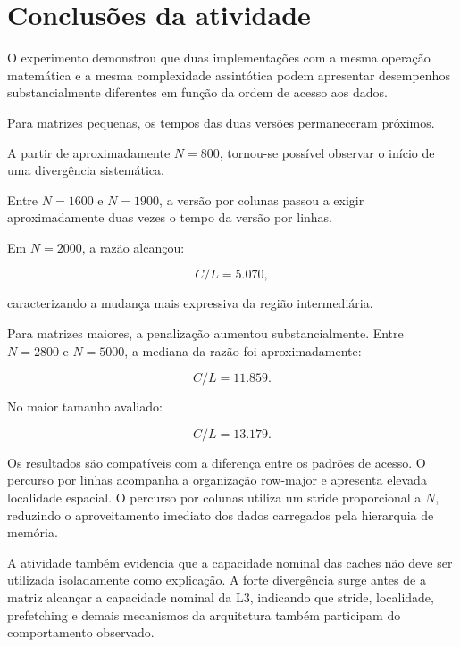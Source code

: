 
\section{Conclusões da atividade}

\label{sec:atvd01-conclusao}

O experimento demonstrou que duas implementações com a mesma operação
matemática e a mesma complexidade assintótica podem apresentar
desempenhos substancialmente diferentes em função da ordem de acesso aos
dados.

Para matrizes pequenas, os tempos das duas versões permaneceram próximos.

A partir de aproximadamente \(N=800\), tornou-se possível observar o
início de uma divergência sistemática.

Entre \(N=1600\) e \(N=1900\), a versão por colunas passou a exigir
aproximadamente duas vezes o tempo da versão por linhas.

Em \(N=2000\), a razão alcançou:

\begin{equation}
    C/L = 5.070,
\end{equation}

caracterizando a mudança mais expressiva da região intermediária.

Para matrizes maiores, a penalização aumentou substancialmente. Entre
\(N=2800\) e \(N=5000\), a mediana da razão foi aproximadamente:

\begin{equation}
    C/L = 11.859.
\end{equation}

No maior tamanho avaliado:

\begin{equation}
    C/L = 13.179.
\end{equation}

Os resultados são compatíveis com a diferença entre os padrões de acesso.
O percurso por linhas acompanha a organização row-major e apresenta
elevada localidade espacial. O percurso por colunas utiliza um stride
proporcional a \(N\), reduzindo o aproveitamento imediato dos dados
carregados pela hierarquia de memória.

A atividade também evidencia que a capacidade nominal das caches não
deve ser utilizada isoladamente como explicação. A forte divergência
surge antes de a matriz alcançar a capacidade nominal da L3, indicando
que stride, localidade, prefetching e demais mecanismos da arquitetura
também participam do comportamento observado.

